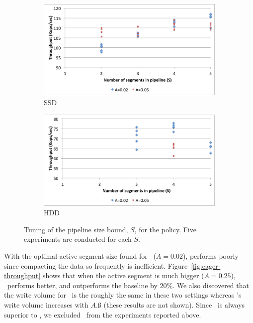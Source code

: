 \begin{figure}[tb]

  \centering
  
  \begin{subfigure}[t]{\columnwidth}
      \includegraphics[width=\figw]{Figs/pipeline-1-ssd.png}
      \caption[]{SSD}
    \label{fig:pipeline:ssd}  
  \end{subfigure}   
  \begin{subfigure}[t]{\columnwidth}
      \includegraphics[width=\figw]{Figs/pipeline-1-hdd.png}
      \caption[]{HDD}
    \label{fig:pipeline:hdd}
  \end{subfigure}

\caption{Tuning of the pipeline size bound, $S$, for the \basic\/ policy. Five experiments are conducted for each $S$.} 
\label{fig:pipeline}
\end{figure}

With the optimal active segment size found for \basic\ ($A=0.02$), \eager\/ performs poorly since compacting the data so frequently is inefficient. 
Figure~\ref{fig:eager-throughput} shows that when the active segment is much bigger ($A=0.25$), \eager\ performs better, and outperforms the 
baseline by $20$\%. We also discovered that the write volume for \eager\ is the roughly the same in these two settings whereas \basic's write volume 
increases with $A$.ß (these results are not shown).  
Since \adp\ is always superior to \eager, we excluded \eager\ from the experiments reported above.  

